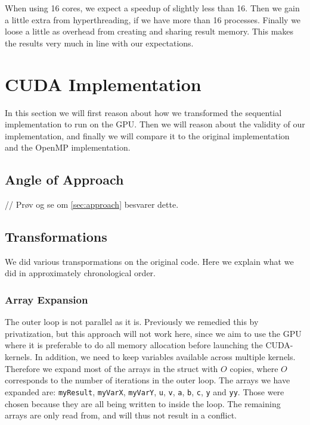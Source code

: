 \documentclass[11pt]{article}
\begin{document}
When using 16 cores, we expect a speedup of slightly less than 16. Then we 
gain a little extra from hyperthreading, if we have more than 16 processes. 
Finally we loose a little as overhead from creating and sharing result memory.
This makes the results very much in line with our expectations.


\section{CUDA Implementation}
In this section we will first reason about how we transformed the sequential
implementation to run on the GPU. Then we will reason about the validity of 
our implementation, and finally we will compare it to the original 
implementation and the OpenMP implementation.

\subsection{Angle of Approach}
// Prøv og se om \autoref{sec:approach} besvarer dette.

\subsection{Transformations}
We did various transpormations on the original code. Here we explain what we 
did in approximately chronological order.

\subsubsection{Array Expansion}
The outer loop is not parallel as it is. Previously we remedied this by privatization,
but this approach will not work here, since we aim to use the GPU where
it is preferable to do all memory allocation before launching the CUDA-kernels.
In addition, we need to keep variables available across multiple kernels. Therefore we
expand most of the arrays in the struct with $O$ copies, where $O$ corresponds to
the number of iterations in the outer loop. The arrays we have expanded are:
\texttt{myResult}, \texttt{myVarX}, \texttt{myVarY}, \texttt{u}, \texttt{v}, \texttt{a}, \texttt{b}, \texttt{c}, \texttt{y} and \texttt{yy}. Those were chosen because 
they are all being written to inside the loop. The remaining arrays are only 
read from, and will thus not result in a conflict. 
\end{document}
